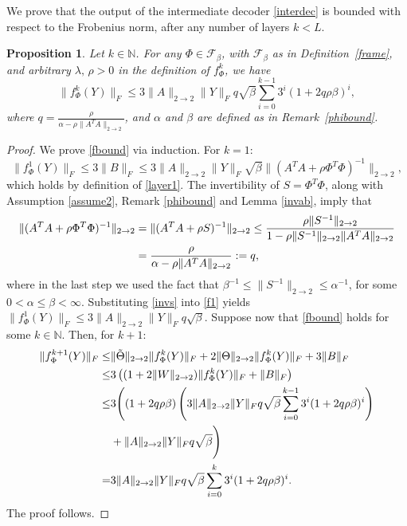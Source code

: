 \documentclass[preprint,12pt]{elsarticle}
\newtheorem{proposition}[theorem]{Proposition}
\newcommand{\opnorm}{2\rightarrow2}
\begin{document}
We prove that the output of the intermediate decoder \eqref{interdec} is bounded with respect to the Frobenius norm, after any number of layers $k<L$.

\begin{proposition}\label{boundedoutput}
    Let $k\in\mathbb{N}$. For any $\Phi\in\mathcal{F}_{\beta }$, with $\mathcal{F}_{\beta }$ as in Definition~\ref{frame}, and arbitrary $\lambda,\,\rho>0$ in the definition of $f_\Phi^k$, we have
    \begin{equation}\label{fbound}
        \|f_\Phi^k(Y)\|_F\leq3\|A\|_{\opnorm}\|Y\|_Fq\sqrt{\beta }\sum_{i=0}^{k-1}3^i(1+2q\rho\beta)^i,
    \end{equation}
where $q=\frac{\rho}{\alpha-\rho\|A^TA\|_{\opnorm}}$, and $\alpha$ and $\beta$ are defined as in Remark~\ref{phibound}.
\end{proposition}

\begin{proof}
    We prove \eqref{fbound} via induction. For $k=1$:
    \begin{equation}\label{f1}
        \|f_\Phi^1(Y)\|_F\leq3\|B\|_F\leq3\|A\|_{\opnorm}\|Y\|_F\sqrt{\beta }\|(A^TA+\rho\Phi^T\Phi)^{-1}\|_{\opnorm},
    \end{equation}
which holds by definition of \eqref{layer1}. The invertibility of $S=\Phi^T\Phi$, along with Assumption \ref{assume2}, Remark \ref{phibound} and Lemma \ref{invab}, imply that
\begin{align}
    \|(A^TA+\rho\Phi^T\Phi)^{-1}\|_{\opnorm}&=\|(A^TA+\rho S)^{-1}\|_{\opnorm}\leq\frac{\rho\|S^{-1}\|_{\opnorm}}{1-\rho\|S^{-1}\|_{\opnorm}\|A^TA\|_{\opnorm}}\notag\\ 
    \label{invs}
    &=\frac{\rho}{\alpha-\rho\|A^TA\|_{\opnorm}}:=q,
\end{align}
where in the last step we used the fact that $\beta^{-1}\leq\|S^{-1}\|_{\opnorm}\leq\alpha^{-1}$, for some $0<\alpha\leq\beta<\infty$. Substituting \eqref{invs} into \eqref{f1} yields $\|f_\Phi^1(Y)\|_F\leq3\|A\|_{\opnorm}\|Y\|_Fq\sqrt{\beta}$. Suppose now that \eqref{fbound} holds for some $k\in\mathbb{N}$. Then, for $k+1$:
\begin{align*}
    \|f_\Phi^{k+1}(Y)\|_F\leq&\|\Tilde{\Theta}\|_{\opnorm}\|f_\Phi^k(Y)\|_F+2\|\Theta\|_{\opnorm}\|f_\Phi^k(Y)\|_F+3\|B\|_F\\
    \leq&3\left((1+2\|W\|_{\opnorm})\|f_\Phi^k(Y)\|_F+\|B\|_F\right)\\
    \leq&3\Bigg((1+2q\rho\beta )\left(3\|A\|_{\opnorm}\|Y\|_Fq\sqrt{\beta}\sum_{i=0}^{k-1}3^i(1+2q\rho\beta )^i\right)\\
    &+\|A\|_{\opnorm}\|Y\|_Fq\sqrt{\beta}\Bigg)\\
    =&3\|A\|_{\opnorm}\|Y\|_Fq\sqrt{\beta}\sum_{i=0}^{k}3^i(1+2q\rho\beta )^i.
\end{align*}
The proof follows.
\end{proof}
\end{document}
